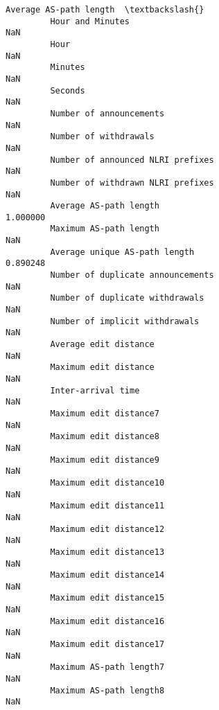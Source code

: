 \documentclass[11pt]{article}
\begin{document}
\begin{Verbatim}[commandchars=\\\{\}]
                                                            Average AS-path length  \textbackslash{}
         Hour and Minutes                                                      NaN   
         Hour                                                                  NaN   
         Minutes                                                               NaN   
         Seconds                                                               NaN   
         Number of announcements                                               NaN   
         Number of withdrawals                                                 NaN   
         Number of announced NLRI prefixes                                     NaN   
         Number of withdrawn NLRI prefixes                                     NaN   
         Average AS-path length                                           1.000000   
         Maximum AS-path length                                                NaN   
         Average unique AS-path length                                    0.890248   
         Number of duplicate announcements                                     NaN   
         Number of duplicate withdrawals                                       NaN   
         Number of implicit withdrawals                                        NaN   
         Average edit distance                                                 NaN   
         Maximum edit distance                                                 NaN   
         Inter-arrival time                                                    NaN   
         Maximum edit distance7                                                NaN   
         Maximum edit distance8                                                NaN   
         Maximum edit distance9                                                NaN   
         Maximum edit distance10                                               NaN   
         Maximum edit distance11                                               NaN   
         Maximum edit distance12                                               NaN   
         Maximum edit distance13                                               NaN   
         Maximum edit distance14                                               NaN   
         Maximum edit distance15                                               NaN   
         Maximum edit distance16                                               NaN   
         Maximum edit distance17                                               NaN   
         Maximum AS-path length7                                               NaN   
         Maximum AS-path length8                                               NaN   

\end{Verbatim}
\end{document}
